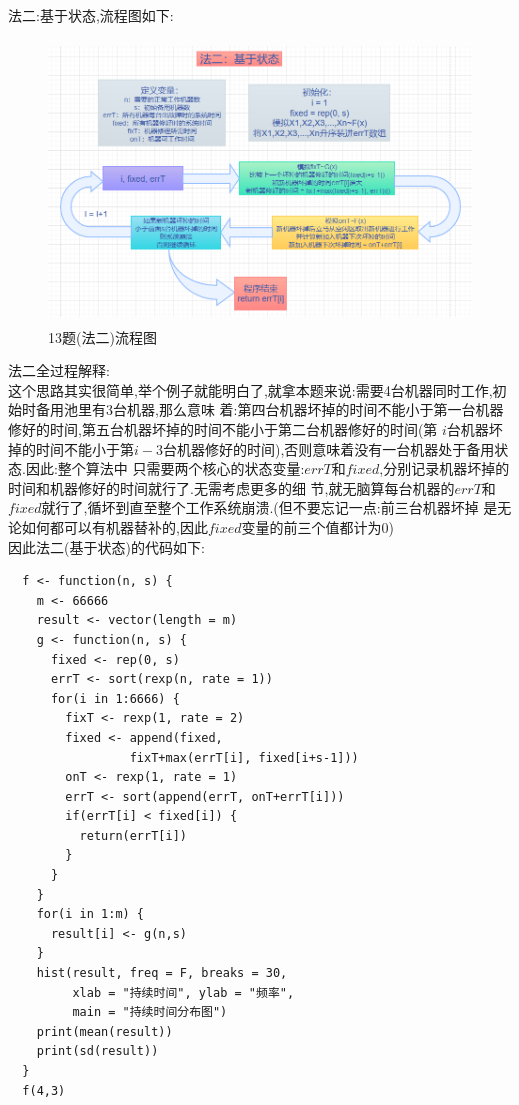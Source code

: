 \documentclass{book}
\begin{document}
\noindent
法二:基于状态,流程图如下: \\
\begin{figure}[H]
    \centering
    \includegraphics*[height = 7.5cm, width = 12cm]{gramFile/十三题/13题(法二)流程图.PNG}
    \caption{13题(法二)流程图}
\end{figure}
\noindent
法二全过程解释: \\
这个思路其实很简单,举个例子就能明白了,就拿本题来说:需要4台机器同时工作,初始时备用池里有3台机器,那么意味
着:第四台机器坏掉的时间不能小于第一台机器修好的时间,第五台机器坏掉的时间不能小于第二台机器修好的时间(第
$i$台机器坏掉的时间不能小于第$i-3$台机器修好的时间),否则意味着没有一台机器处于备用状态.因此:整个算法中
只需要两个核心的状态变量:$errT$和$fixed$,分别记录机器坏掉的时间和机器修好的时间就行了.无需考虑更多的细
节,就无脑算每台机器的$errT$和$fixed$就行了,循坏到直至整个工作系统崩溃.(但不要忘记一点:前三台机器坏掉
是无论如何都可以有机器替补的,因此$fixed$变量的前三个值都计为0) \\
\noindent
因此法二(基于状态)的代码如下:
\lstset{language = R}
\begin{lstlisting}
  f <- function(n, s) {  
    m <- 66666
    result <- vector(length = m)
    g <- function(n, s) {
      fixed <- rep(0, s)
      errT <- sort(rexp(n, rate = 1))
      for(i in 1:6666) {
        fixT <- rexp(1, rate = 2)
        fixed <- append(fixed, 
                 fixT+max(errT[i], fixed[i+s-1]))
        onT <- rexp(1, rate = 1)
        errT <- sort(append(errT, onT+errT[i]))
        if(errT[i] < fixed[i]) {
          return(errT[i])
        }
      }
    }
    for(i in 1:m) {
      result[i] <- g(n,s)
    }
    hist(result, freq = F, breaks = 30, 
         xlab = "持续时间", ylab = "频率", 
         main = "持续时间分布图")
    print(mean(result))
    print(sd(result))
  }
  f(4,3)
\end{lstlisting}
\end{document}
